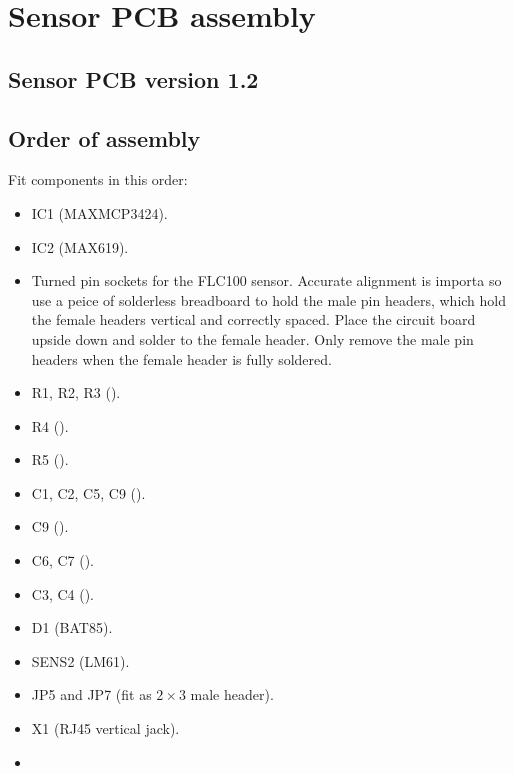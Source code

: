 \chapter{Sensor PCB assembly}

\section{Sensor PCB version 1.2}

\section{Order of assembly}
Fit components in this order:
\begin{itemize}
\item IC1 (MAXMCP3424).
\item IC2 (MAX619).
\item Turned pin sockets for the FLC100 sensor. Accurate alignment is
  importa so use a peice of solderless breadboard to hold the male pin
  headers, which hold the female headers vertical and correctly
  spaced. Place the circuit board upside down and solder to the female
  header. Only remove the male pin headers when the female header is
  fully soldered.
\item R1, R2, R3 ().
\item R4 ().
\item R5 ().
\item C1, C2, C5, C9 ().
\item C9 ().  
\item C6, C7 ().
\item C3, C4 ().
\item D1 (BAT85).
\item SENS2 (LM61).
\item JP5 and JP7 (fit as $2\times3$ male header).
\item X1 (RJ45 vertical jack).
\item {}
\end{itemize}


